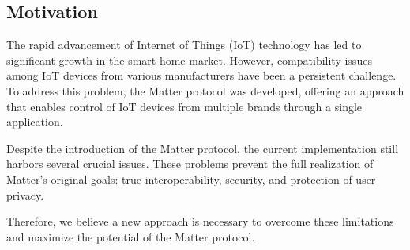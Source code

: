 \documentclass[conference]{IEEEtran}
\begin{document}
\subsection{Motivation}
The rapid advancement of Internet of Things (IoT) technology has led to significant
growth in the smart home market. However, compatibility issues among IoT devices
from various manufacturers have been a persistent challenge. To address this
problem, the Matter protocol was developed, offering an approach that enables
control of IoT devices from multiple brands through a single application.

Despite the introduction of the Matter protocol, the current implementation still
harbors several crucial issues. These problems prevent the full realization of
Matter's original goals: true interoperability, security, and protection of user
privacy.

Therefore, we believe a new approach is necessary to overcome these
limitations and maximize the potential of the Matter protocol.
\end{document}
